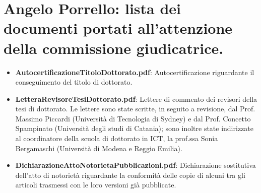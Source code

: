 \documentclass[letterpaper,11pt]{article}
\begin{document}
\section{Angelo Porrello: lista dei documenti portati all'attenzione della commissione giudicatrice.}

\vspace{1em}

\begin{itemize}
    \item \textbf{AutocertificazioneTitoloDottorato.pdf}: Autocertificazione riguardante il conseguimento del titolo di dottorato.
    \item \textbf{LetteraRevisoreTesiDottorato.pdf}: Lettere di commento dei revisori della tesi di dottorato. Le lettere sono state scritte, in seguito a revisione, dal Prof. Massimo Piccardi (Università di Tecnologia di Sydney) e dal Prof. Concetto Spampinato (Università degli studi di Catania); sono inoltre state indirizzate al coordinatore della scuola di dottorato in ICT, la prof.ssa Sonia Bergamaschi (Università di Modena e Reggio Emilia).
    \item \textbf{DichiarazioneAttoNotorietaPubblicazioni.pdf}: Dichiarazione sostitutiva dell'atto di notorietà riguardante la conformità delle copie di alcuni tra gli articoli trasmessi con le loro versioni già pubblicate.


\end{itemize}
\end{document}
